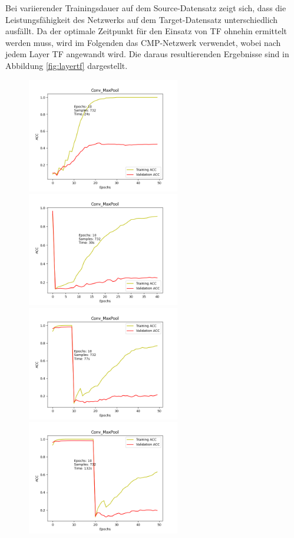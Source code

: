 Bei variierender Trainingsdauer auf dem Source-Datensatz zeigt sich, dass die Leistungsfähigkeit des Netzwerks auf dem Target-Datensatz 
unterschiedlich ausfällt. Da der optimale Zeitpunkt für den Einsatz von TF ohnehin ermittelt werden muss, wird im 
Folgenden das CMP-Netzwerk verwendet, wobei nach jedem Layer TF angewandt wird. Die daraus resultierenden Ergebnisse sind in Abbildung 
\ref{fig:layertf} dargestellt.

\begin{figure}[htpb]
    \includegraphics[height=5cm]{../../Plots/ba_plots/convmaxpool/wotr.png}
    \includegraphics[height=5cm]{../../Plots/ba_plots/convmaxpool/epochTFtr.png}
    \includegraphics[height=5cm]{../../Plots/ba_plots/convmaxpool/1TFtr.png}
    \includegraphics[height=5cm]{../../Plots/ba_plots/convmaxpool/2TFtr.png}

\end{figure}
